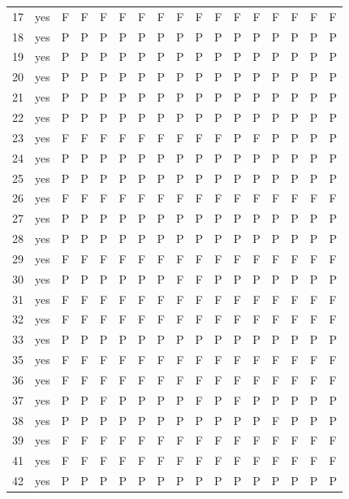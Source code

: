 \begin{table}[p]
\begin{tabular*}{\textwidth}{@{\extracolsep{\fill}}rcccccccccccccccc}
17 & yes & F & F & F & F & F & F & F & F & F & F & F & F & F & F & F\\
18 & yes & P & P & P & P & P & P & P & P & P & P & P & P & P & P & P\\
19 & yes & P & P & P & P & P & P & P & P & P & P & P & P & P & P & P\\
20 & yes & P & P & P & P & P & P & P & P & P & P & P & P & P & P & P\\
21 & yes & P & P & P & P & P & P & P & P & P & P & P & P & P & P & P\\
22 & yes & P & P & P & P & P & P & P & P & P & P & P & P & P & P & P\\
23 & yes & F & F & F & F & F & F & F & F & F & P & F & P & P & P & P\\
24 & yes & P & P & P & P & P & P & P & P & P & P & P & P & P & P & P\\
25 & yes & P & P & P & P & P & P & P & P & P & P & P & P & P & P & P\\
26 & yes & F & F & F & F & F & F & F & F & F & F & F & F & F & F & F\\
27 & yes & P & P & P & P & P & P & P & P & P & P & P & P & P & P & P\\
28 & yes & P & P & P & P & P & P & P & P & P & P & P & P & P & P & P\\
29 & yes & F & F & F & F & F & F & F & F & F & F & F & F & F & F & F\\
30 & yes & P & P & P & P & P & P & F & F & P & P & P & P & P & P & P\\
31 & yes & F & F & F & F & F & F & F & F & F & F & F & F & F & F & F\\
32 & yes & F & F & F & F & F & F & F & F & F & F & F & F & F & F & F\\
33 & yes & P & P & P & P & P & P & P & P & P & P & P & P & P & P & P\\
35 & yes & F & F & F & F & F & F & F & F & F & F & F & F & F & F & F\\
36 & yes & F & F & F & F & F & F & F & F & F & F & F & F & F & F & F\\
37 & yes & P & P & F & P & P & P & P & F & P & F & P & P & P & P & P\\
38 & yes & P & P & P & P & P & P & P & P & P & P & P & F & P & P & P\\
39 & yes & F & F & F & F & F & F & F & F & F & F & F & F & F & F & F\\
41 & yes & F & F & F & F & F & F & F & F & F & F & F & F & F & F & F\\
42 & yes & P & P & P & P & P & P & P & P & P & P & P & P & P & P & P\\

\end{tabular*}
\end{table}
